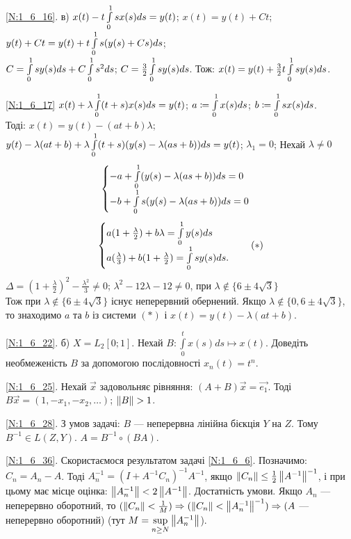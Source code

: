 \noindent\ref{N:1_6_16}. в) $x(t) - t\int\limits_{0}^{1}sx(s)ds = y(t)$;\; $x(t) = y(t) +Ct$;\\
$y(t) +Ct = y(t) + t \int\limits_{0}^{1}s(y(s) + Cs)ds$;\\
$C = \int\limits_{0}^{1}sy(s)ds + C \int\limits_{0}^{1}s^2ds$;\;
$C = \frac{3}{2} \int\limits_{0}^{1}sy(s)ds$.\; Тож:
$x(t) = y(t) + \frac{3}{2}t\int\limits_{0}^{1}sy(s)ds$. 

\noindent\ref{N:1_6_17} $x(t) + \lambda \int\limits_{0}^{1}(t+s)x(s)ds = y(t)$;\;
$a \coloneqq \int\limits_{0}^{1} x(s) ds$;\; $b \coloneqq \int\limits_{0}^{1} sx(s)ds$.\\
Тоді: $x(t) = y(t) - (at +b)\lambda$;\;
$y(t) - \lambda(at + b) + \lambda\int\limits_{0}^{1}(t+s)(y(s) - \lambda(as+b))ds = y(t)$;
$\lambda_1 = 0$; Нехай $\lambda \neq 0$
\[\begin{cases}
    - a + \int\limits_{0}^{1}(y(s) - \lambda(as + b))ds = 0\\
    - b + \int\limits_{0}^{1}s(y(s) - \lambda(as + b))ds = 0
\end{cases}\]
\[\begin{cases}
    a(1 + \frac{\lambda}{2}) + b\lambda = \int\limits_{0}^{1}y(s)ds\\
    a(\frac{\lambda}{3}) + b(1 + \frac{\lambda}{2}) = \int\limits_{0}^{1} sy(s)ds.
\end{cases}
\quad (*)\]
$\Delta = (1 + \frac{\lambda}{2})^2 - \frac{\lambda^2}{3} \neq 0$; \;
$\lambda^2 - 12\lambda -12 \neq 0$, при
$\lambda \not\in \{6 \pm 4\sqrt{3}\}$\\
Тож при $\lambda \not\in \{6 \pm 4\sqrt{3}\}$ існує неперервний обернений.
Якщо $\lambda \not\in \{0, 6 \pm 4\sqrt{3}\}$, то знаходимо $a$ та $b$ із системи $(*)$
і $x(t) = y(t) - \lambda(at+b)$.

\noindent\ref{N:1_6_22}. б) $X = L_2 [0; 1]$. Нехай $B: \int\limits_0^t x(s) ds \mapsto x(t)$. Доведіть необмеженість
$B$ за допомогою послідовності $x_n(t) = t^n$.

\noindent\ref{N:1_6_25}. Нехай $\vec{x}$ задовольняє рівняння: $(A+B) \vec{x} = \vec{e_1}$.
Тоді $B \vec{x} = (1, -x_1, -x_2, \dots)$; $\left\lVert B\right\rVert > 1$.

\noindent\ref{N:1_6_28}. З умов задачі: $B$ --- неперервна лінійна бієкція $Y$ на $Z$. Тому
$B^{-1} \in L(Z, Y)$. $A = B^{-1} \circ (BA)$.

\noindent\ref{N:1_6_36}. Скористаємося результатом задачі \ref{N:1_6_6}. Позначимо: $C_n = A_n - A$.
Тоді $A_n^{-1} = (I+A^{-1}C_n)^{-1} A^{-1}$, якщо $\left\lVert C_n\right\rVert \leq \frac{1}{2} \left\lVert A^{-1}\right\rVert^{-1}$, і при цьому має місце
оцінка: $\left\lVert A_n^{-1}\right\rVert < 2\left\lVert A^{-1}\right\rVert$.
Достатність умови. Якщо $A_n$ --- неперервно оборотний, то $(\left\lVert C_n\right\rVert<\frac{1}{M}) \Rightarrow (\left\lVert C_n\right\rVert < \left\lVert A_n^{-1}\right\rVert^{-1}) \Rightarrow (A$
 --- неперервно оборотний) (тут $M = \sup\limits_{n \geq N} \left\lVert A_n^{-1}\right\rVert$).

